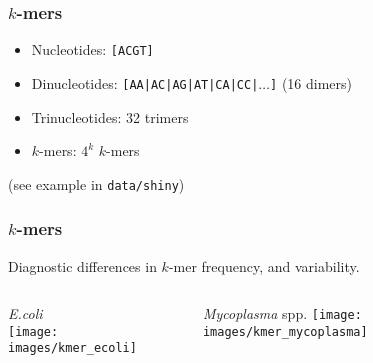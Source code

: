 \begin{frame}
  \frametitle{$k$-mers}
     \begin{itemize}
       \item Nucleotides: \texttt{[ACGT]}
       \item Dinucleotides: \texttt{[AA|AC|AG|AT|CA|CC|$\ldots$]} (16 dimers)
       \item Trinucleotides: 32 trimers
       \item $k$-mers: $4^k$ $k$-mers
     \end{itemize}
     (see example in \texttt{data/shiny})
\end{frame}

\begin{frame}
  \frametitle{$k$-mers}
  Diagnostic differences in $k$-mer frequency, and variability.
  \begin{columns}[T]
    \begin{column}{5cm}
    \textit{E.coli}\\
     \texttt{[image: images/kmer\_ecoli]}\\
    \end{column}
    \begin{column}{5cm}     
     \textit{Mycoplasma} spp.
     \texttt{[image: images/kmer\_mycoplasma]}\\
   \end{column}
  \end{columns}
\end{frame}